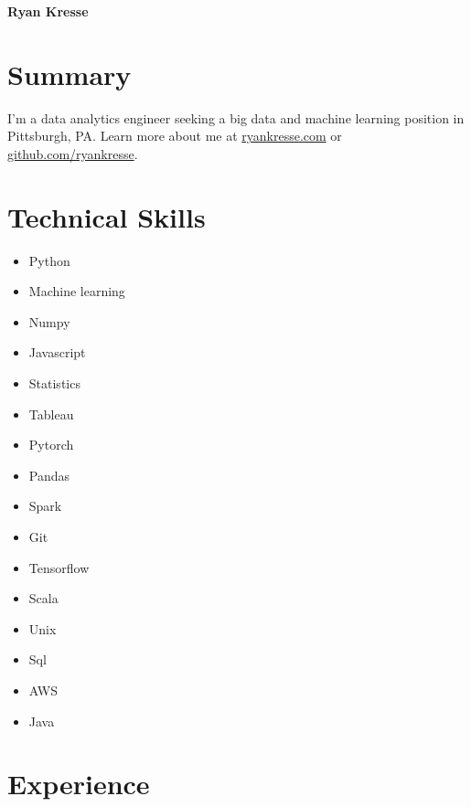 \documentclass[11pt]{article}
\begin{document}
	\noindent \textbf{{\fontsize{38pt}{\parskip}\selectfont \color{RyanRed} Ryan Kresse}}
	\smallskip


	\section{Summary}
	I'm a data analytics engineer seeking a big data and machine learning position in \newline Pittsburgh, PA. Learn more about me at \href{http://ryankresse.com/blog}{ryankresse.com} or \href{https://github.com/ryankresse}{github.com/ryankresse}.
	\section{Technical Skills}
		\begin{multicols}{4}
			\begin{itemize}
				\item Python
				\item Machine learning
				\item Numpy
				\item Javascript

				\columnbreak
				\item Statistics
				\item Tableau
				\item Pytorch
				\item Pandas

				\columnbreak
				\item Spark
				\item Git
				\item Tensorflow
				\item Scala

				\columnbreak
				\item Unix
				\item Sql
				\item AWS
				\item Java

				\columnbreak

			\end{itemize}
		\end{multicols}



	\section{Experience}
\end{document}
